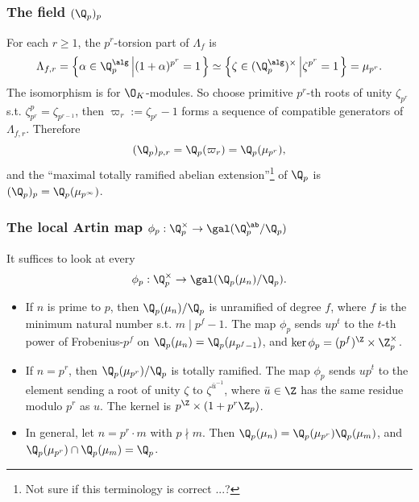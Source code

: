 \subsubsection*{The field $(\Q_p)_p$}

For each $r\ge 1$, the $p^r$-torsion part of $\Lambda_f$ is
\[\Lambda_{f, r} = \left\{\alpha\in\Q_p^\alg\left|(1 + \alpha)^{p^r} = 1\right.\right\}\simeq
\left\{\zeta\in(\Q_p^\alg)^{\times}
\left|\zeta^{p^r} = 1\right.\right\} = \mu_{p^r}.\]
The isomorphism is for $\O_K$-modules.
So choose primitive $p^r$-th roots of unity $\zeta_{p^r}$ s.t. $\zeta_{p^r}^p = \zeta_{p^{r-1}}$,
then $\varpi_r := \zeta_{p^r} - 1$ forms a sequence of compatible generators of $\Lambda_{f, r}$.
Therefore \[(\Q_p)_{p, r} = \Q_p(\varpi_r) = \Q_p(\mu_{p^r}),\]
and the ``maximal totally ramified abelian extension''\footnote{Not sure if this terminology is correct ...?} of $\Q_p$ is $(\Q_p)_p = \Q_p(\mu_{p^\infty})$.

\subsubsection*{The local Artin map \texorpdfstring{$\phi_p : \Q_p^\times\to \gal(\Q_p^\ab/\Q_p)$}{}}

It suffices to look at every \[\phi_p : \Q_p^\times\to \gal(\Q_p(\mu_n)/\Q_p).\]
\begin{itemize}
    \item If $n$ is prime to $p$, then $\Q_p(\mu_n)/\Q_p$ is unramified of degree $f$, where $f$ is the minimum natural number s.t. $m\mid p^f - 1$.
    The map $\phi_p$ sends $up^t$ to the $t$-th power of Frobenius-$p^f$ on $\Q_p(\mu_n) = \Q_p(\mu_{p^f - 1})$, and $\ker\phi_p = (p^{f})^{\Z}\times\Z_p^\times$.
    \item If $n = p^r$, then $\Q_p(\mu_{p^r})/\Q_p$ is totally ramified. The map $\phi_p$ sends $up^t$ to the element sending a root of unity $\zeta$ to $\zeta^{\bar u^{-1}}$, where $\bar u\in\Z$ has the same residue modulo $p^r$ as $u$.
    The kernel is $p^\Z\times (1 + p^r\Z_p)$.
    \item In general, let $n = p^r\cdot m$ with $p\nmid m$. Then $\Q_p(\mu_n) = \Q_p(\mu_{p^r})\Q_p(\mu_m)$, and $\Q_p(\mu_{p^r})\cap\Q_p(\mu_m) = \Q_p$.
\end{itemize}



